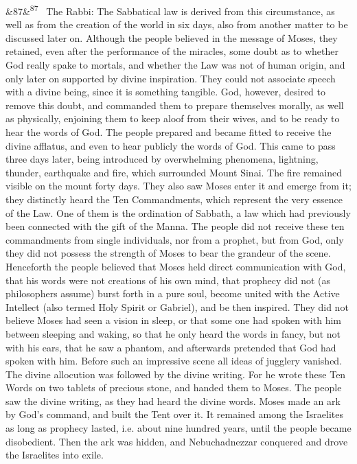 \documentclass[12pt]{article}
\newcommand{\para}[1][]{\par\noindent\ifx&#1&\else\textsuperscript{\footnotesize #1}~\fi}
\begin{document}
\para[87] The Rabbi: The Sabbatical law is derived from this circumstance, as well as from the creation of the world in six days, also from another matter to be discussed later on. Although the people believed in the message of Moses, they retained, even after the performance of the miracles, some doubt as to whether God really spake to mortals, and whether the Law was not of human origin, and only later on supported by divine inspiration. They could not associate speech with a divine being, since it is something tangible. God, however, desired to remove this doubt, and commanded them to prepare themselves morally, as well as physically, enjoining them to keep aloof from their wives, and to be ready to hear the words of God. The people prepared and became fitted to receive the divine afflatus, and even to hear publicly the words of God. This came to pass three days later, being introduced by overwhelming phenomena, lightning, thunder, earthquake and fire, which surrounded Mount Sinai. The fire remained visible on the mount forty days. They also saw Moses enter it and emerge from it; they distinctly heard the Ten Commandments, which represent the very essence of the Law. One of them is the ordination of Sabbath, a law which had previously been connected with the gift of the Manna. The people did not receive these ten commandments from single individuals, nor from a prophet, but from God, only they did not possess the strength of Moses to bear the grandeur of the scene. Henceforth the people believed that Moses held direct communication with God, that his words were not creations of his own mind, that prophecy did not (as philosophers assume) burst forth in a pure soul, become united with the Active Intellect (also termed Holy Spirit or Gabriel), and be then inspired. They did not believe Moses had seen a vision in sleep, or that some one had spoken with him between sleeping and waking, so that he only heard the words in fancy, but not with his ears, that he saw a phantom, and afterwards pretended that God had spoken with him. Before such an impressive scene all ideas of jugglery vanished. The divine allocution was followed by the divine writing. For he wrote these Ten Words on two tablets of precious stone, and handed them to Moses. The people saw the divine writing, as they had heard the divine words. Moses made an ark by God's command, and built the Tent over it. It remained among the Israelites as long as prophecy lasted, i.e. about nine hundred years, until the people became disobedient. Then the ark was hidden, and Nebuchadnezzar conquered and drove the Israelites into exile.
\end{document}

